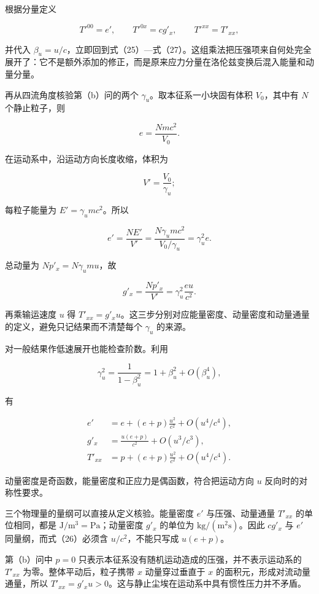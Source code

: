 \documentclass[12pt,a4paper,UTF8]{ctexart}
\begin{document}
根据分量定义

\[
T'^{00}=e',
\qquad
T'^{0x}=cg'_x,
\qquad
T'^{xx}=T'_{xx}, \tag{39}
\]

并代入
\(\beta_u=u/c\)，立即回到式（25）---式（27）。这组乘法把压强项来自何处完全展开了：它不是额外添加的修正，而是原来应力分量在洛伦兹变换后混入能量和动量分量。

再从四流角度核验第（b）问的两个 \(\gamma_u\)。取本征系一小块固有体积
\(V_0\)，其中有 \(N\) 个静止粒子，则

\[
e=\frac{Nmc^2}{V_0}. \tag{40}
\]

在运动系中，沿运动方向长度收缩，体积为

\[
V'=\frac{V_0}{\gamma_u}; \tag{41}
\]

每粒子能量为 \(E'=\gamma_umc^2\)。所以

\[
e'=\frac{NE'}{V'}
=\frac{N\gamma_umc^2}{V_0/\gamma_u}
=\gamma_u^2e. \tag{42}
\]

总动量为 \(Np'_x=N\gamma_umu\)，故

\[
g'_x=\frac{Np'_x}{V'}
=\gamma_u^2\frac{eu}{c^2}. \tag{43}
\]

再乘输运速度 \(u\) 得
\(T'_{xx}=g'_xu\)。这三步分别对应能量密度、动量密度和动量通量的定义，避免只记结果而不清楚每个
\(\gamma_u\) 的来源。

对一般结果作低速展开也能检查阶数。利用

\[
\gamma_u^2=\frac1{1-\beta_u^2}
=1+\beta_u^2+O(\beta_u^4), \tag{44}
\]

有

\[
\begin{aligned}
e'&=e+(e+p)\frac{u^2}{c^2}+O(u^4/c^4),\\
g'_x&=\frac{u(e+p)}{c^2}+O(u^3/c^3),\\
T'_{xx}&=p+(e+p)\frac{u^2}{c^2}+O(u^4/c^4).
\end{aligned} \tag{45}
\]

动量密度是奇函数，能量密度和正应力是偶函数，符合把运动方向 \(u\)
反向时的对称性要求。

三个物理量的量纲可以直接从定义核验。能量密度 \(e'\) 与压强、动量通量
\(T'_{xx}\) 的单位相同，都是 \(\mathrm{J/m^3}=\mathrm{Pa}\)；动量密度
\(g'_x\) 的单位为 \(\mathrm{kg/(m^2s)}\)。因此 \(cg'_x\) 与 \(e'\)
同量纲，而式（26）必须含 \(u/c^2\)，不能只写成 \(u(e+p)\)。

第（b）问中 \(p=0\) 只表示本征系没有随机运动造成的压强，并不表示运动系的
\(T'_{xx}\) 为零。整体平动后，粒子携带 \(x\) 动量穿过垂直于 \(x\)
的面积元，形成对流动量通量，所以
\(T'_{xx}=g'_xu>0\)。这与静止尘埃在运动系中具有惯性压力并不矛盾。
\end{document}
